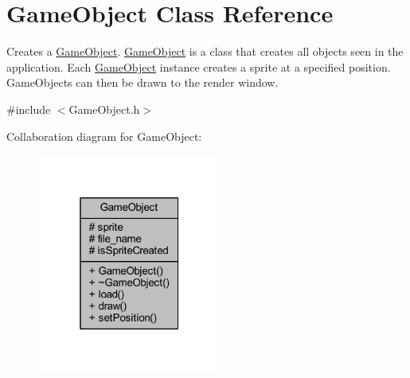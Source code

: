 \hypertarget{class_game_object}{\section{Game\+Object Class Reference}
\label{class_game_object}
}


Creates a \hyperlink{class_game_object}{Game\+Object}. \hyperlink{class_game_object}{Game\+Object} is a class that creates all objects seen in the application. Each \hyperlink{class_game_object}{Game\+Object} instance creates a sprite at a specified position. Game\+Objects can then be drawn to the render window.  




{\ttfamily \#include $<$Game\+Object.\+h$>$}



Collaboration diagram for Game\+Object\+:
\nopagebreak
\begin{figure}[H]
\begin{center}
\leavevmode
\includegraphics[width=172pt]{class_game_object__coll__graph}
\end{center}
\end{figure}
